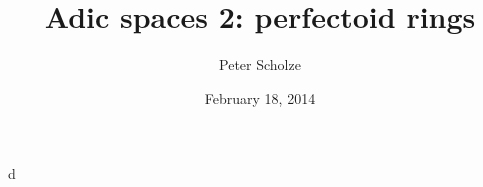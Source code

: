 \documentclass{article}
\title{Adic spaces 2: perfectoid rings}
\author{Peter Scholze}
\date{February 18, 2014}
\begin{document}
\maketitle





d
\end{document}

